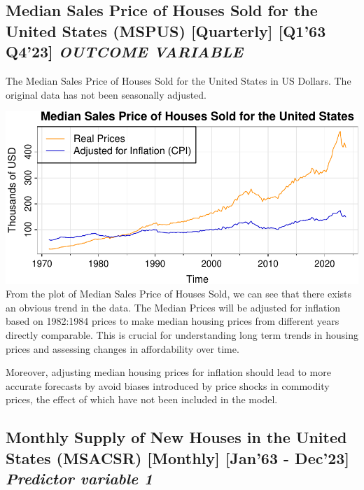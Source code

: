\documentclass[
  man]{apa6}
\begin{document}
\subsection{\texorpdfstring{Median Sales Price of Houses Sold for the United States (MSPUS) {[}Quarterly{]} {[}Q1'63 Q4'23{]} \emph{OUTCOME VARIABLE}}{Median Sales Price of Houses Sold for the United States (MSPUS) {[}Quarterly{]} {[}Q1'63 Q4'23{]} OUTCOME VARIABLE}}\label{median-sales-price-of-houses-sold-for-the-united-states-mspus-quarterly-q163-q423-outcome-variable}

The Median Sales Price of Houses Sold for the United States in US Dollars. The original data has not been seasonally adjusted.

\includegraphics{STAT429Report_files/figure-latex/unnamed-chunk-2-1.pdf}
From the plot of Median Sales Price of Houses Sold, we can see that there exists an obvious trend in the data. The Median Prices will be adjusted for inflation based on 1982:1984 prices to make median housing prices from different years directly comparable. This is crucial for understanding long term trends in housing prices and assessing changes in affordability over time.

Moreover, adjusting median housing prices for inflation should lead to more accurate forecasts by avoid biases introduced by price shocks in commodity prices, the effect of which have not been included in the model.

\subsection{\texorpdfstring{Monthly Supply of New Houses in the United States (MSACSR) {[}Monthly{]} {[}Jan'63 - Dec'23{]} \emph{Predictor variable 1}}{Monthly Supply of New Houses in the United States (MSACSR) {[}Monthly{]} {[}Jan'63 - Dec'23{]} Predictor variable 1}}\label{monthly-supply-of-new-houses-in-the-united-states-msacsr-monthly-jan63---dec23-predictor-variable-1}
\end{document}
